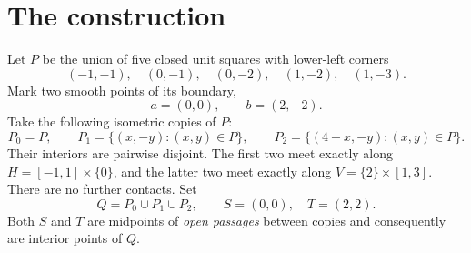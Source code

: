 \documentclass[11pt]{article}
\theoremstyle{remark}
\begin{document}
\section{The construction}
Let $P$ be the union of five closed unit squares with lower-left corners
\begin{equation}\label{eq:squares}
(-1,-1),\quad(0,-1),\quad(0,-2),\quad(1,-2),\quad(1,-3).
\end{equation}
Mark two smooth points of its boundary,
\begin{equation}\label{eq:ab}
a=(0,0),\qquad b=(2,-2).
\end{equation}
Take the following isometric copies of $P$:
\begin{equation}\label{eq:copies}
P_0=P,\qquad P_1=\{(x,-y):(x,y)\in P\},\qquad
P_2=\{(4-x,-y):(x,y)\in P\}.
\end{equation}
Their interiors are pairwise disjoint. The first two meet exactly along
\(H=[-1,1]\times\{0\}\), and the latter two meet exactly along
\(V=\{2\}\times[1,3]\). There are no further contacts. Set
\[
Q=P_0\cup P_1\cup P_2,\qquad S=(0,0),\quad T=(2,2).
\]
Both $S$ and $T$ are midpoints of \emph{open passages} between copies and consequently are interior points of $Q$.
\end{document}
